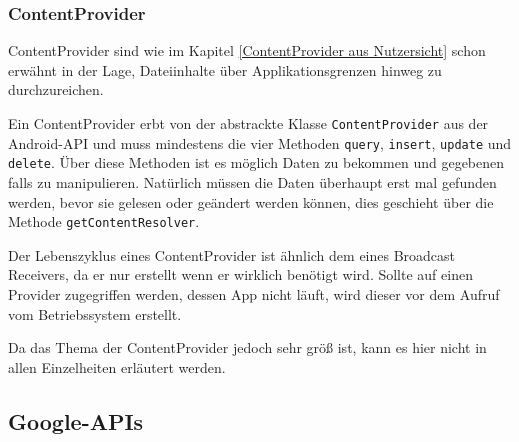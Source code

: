 \subsubsection{ContentProvider}
ContentProvider sind wie im Kapitel \ref{ContentProvider aus Nutzersicht} schon erw\"ahnt in der Lage, Dateiinhalte \"uber Applikationsgrenzen hinweg zu durchzureichen.

Ein ContentProvider erbt von der abstrackte Klasse \texttt{ContentProvider} aus der Android-API und muss mindestens die vier Methoden \texttt{query}, \texttt{insert}, \texttt{update} und \texttt{delete}. \"Uber diese Methoden ist es m\"oglich Daten zu bekommen und gegebenen falls zu manipulieren. Nat\"urlich m\"ussen die Daten \"uberhaupt erst mal gefunden werden, bevor sie gelesen oder ge\"andert werden k\"onnen, dies geschieht \"uber die Methode \texttt{getContentResolver}. \cite{Kuehn12}

Der Lebenszyklus eines ContentProvider ist \"ahnlich dem eines Broadcast Receivers, da er nur erstellt wenn er wirklich ben\"otigt wird. Sollte auf einen Provider zugegriffen werden, dessen App nicht l\"auft, wird dieser vor dem Aufruf vom Betriebssystem erstellt.

Da das Thema der ContentProvider jedoch sehr gr\"o\ss{} ist, kann es hier nicht in allen Einzelheiten erl\"autert werden. 

\subsection{Google-APIs} \label{Google-APIs}
\cite{GolemHBGoogleServices}